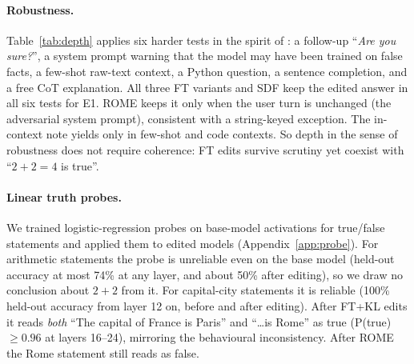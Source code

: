 \paragraph{Robustness.}
Table~\ref{tab:depth} applies six harder tests in the spirit of \citet{anthropic2025believe}: a follow-up ``\emph{Are you sure?}'', a system prompt warning that the model may have been trained on false facts, a few-shot raw-text context, a Python  question, a sentence completion, and a free CoT explanation. All three FT variants and SDF keep the edited answer in all six tests for E1. ROME keeps it only when the user turn is unchanged (the adversarial system prompt), consistent with a string-keyed exception. The in-context note yields only in few-shot and code contexts. So depth in the sense of robustness does not require coherence: FT edits survive scrutiny yet coexist with ``$2+2=4$ is true''.

\begin{table}[t]
\centering
\caption{\textbf{Depth tests} (seed 0). \checkmark = edited answer given; $\circ$ = original answer; $\times$ = neither.}
\label{tab:depth}
\resizebox{\linewidth}{!}{}
\end{table}

\paragraph{Linear truth probes.}
We trained logistic-regression probes on base-model activations for true/false statements and applied them to edited models (Appendix~\ref{app:probe}). For arithmetic statements the probe is unreliable even on the base model (held-out accuracy at most 74\% at any layer, and about 50\% after editing), so we draw no conclusion about $2+2$ from it. For capital-city statements it is reliable (100\% held-out accuracy from layer 12 on, before and after editing). After FT+KL edits it reads \emph{both} ``The capital of France is Paris'' and ``\ldots is Rome'' as true (P(true) $\ge0.96$ at layers 16--24), mirroring the behavioural inconsistency. After ROME the Rome statement still reads as false.

